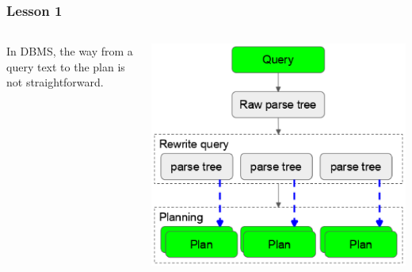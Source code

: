 \documentclass{beamer}
\begin{document}
\begin{frame}[fragile]\frametitle{Lesson 1}
\begin{columns}\begin{column}{0.5\textwidth}
In DBMS, the way from a query text to the plan is not straightforward.
\end{column}\begin{column}{0.5\textwidth}
\begin{center}
  \includegraphics[scale=0.5]{query_planning_stages}
\end{center}\end{column}\end{columns}
\end{frame}
\end{document}

